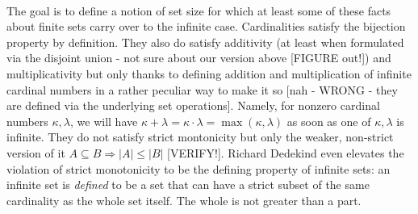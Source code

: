 \documentclass[12pt]{article}
\begin{document}



\paragraph{} The goal is to define a notion of set size for which at least some of these facts about finite sets carry over to the infinite case. Cardinalities satisfy the bijection property by definition. They also do satisfy additivity (at least when formulated via the disjoint union - not sure about our version above [FIGURE out!]) and multiplicativity but only thanks to defining addition and multiplication of infinite cardinal numbers in a rather peculiar way to make it so [nah - WRONG - they are defined via the underlying set operations]. Namely, for nonzero cardinal numbers $\kappa, \lambda$, we will have $\kappa + \lambda = \kappa \cdot \lambda = \max(\kappa, \lambda)$ as soon as one of $\kappa, \lambda$ is infinite. They do not satisfy strict montonicity but only the weaker, non-strict version of it $A \subseteq B \Rightarrow |A| \leq |B|$ [VERIFY!]. Richard Dedekind even elevates the violation of strict monotonicity to be the defining property of infinite sets: an infinite set is \emph{defined} to be a set that can have a strict subset of the same cardinality as the whole set itself. The whole is not greater than a part.
\end{document}
